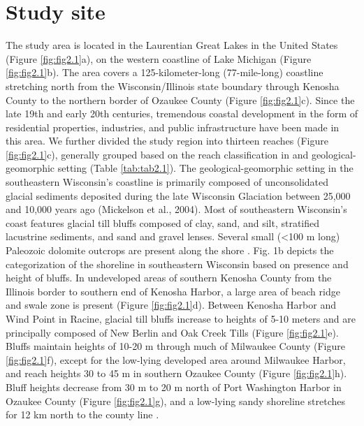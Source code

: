 \section{Study site} 
\label{Study site} 

The study area is located in the Laurentian Great Lakes in the United States
(Figure \ref{fig:fig2.1}a), on the western coastline of Lake Michigan (Figure
\ref{fig:fig2.1}b). The area covers a 125-kilometer-long (77-mile-long)
coastline stretching north from the Wisconsin/Illinois state boundary through
Kenosha County to the northern border of Ozaukee County (Figure
\ref{fig:fig2.1}c). Since the late 19th and early 20th centuries, tremendous
coastal development in the form of residential properties, industries, and
public infrastructure have been made in this area. We further divided the study
region into thirteen reaches (Figure \ref{fig:fig2.1}c), generally grouped based
on the reach classification in \citet{mickelson1977shoreline} and
geological-geomorphic setting (Table \ref{tab:tab2.1}). The
geological-geomorphic setting in the southeastern Wisconsin’s coastline is
primarily composed of unconsolidated glacial sediments deposited during the late
Wisconsin Glaciation between 25,000 and 10,000 years ago (Mickelson et al.,
2004). Most of southeastern Wisconsin’s coast features glacial till bluffs
composed of clay, sand, and silt, stratified lacustrine sediments, and sand and
gravel lenses. Several small (<100 m long) Paleozoic dolomite outcrops are
present along the shore \citep{mickelson1977shoreline,mickelson2004erosion}.
Fig. 1b depicts the categorization of the shoreline in southeastern Wisconsin
based on presence and height of bluffs. In undeveloped areas of southern Kenosha
County from the Illinois border to southern end of Kenosha Harbor, a large area
of beach ridge and swale zone is present (Figure \ref{fig:fig2.1}d). Between
Kenosha Harbor and Wind Point in Racine, glacial till bluffs increase to heights
of 5-10 meters and are principally composed of New Berlin and Oak Creek Tills
(Figure \ref{fig:fig2.1}e). Bluffs maintain heights of 10-20 m through much of
Milwaukee County (Figure \ref{fig:fig2.1}f), except for the low-lying developed
area around Milwaukee Harbor, and reach heights 30 to 45 m in southern Ozaukee
County (Figure \ref{fig:fig2.1}h). Bluff heights decrease from 30 m to 20 m
north of Port Washington Harbor in Ozaukee County (Figure \ref{fig:fig2.1}g),
and a low-lying sandy shoreline stretches for 12 km north to the county line
\citep{mickelson1977shoreline}.

